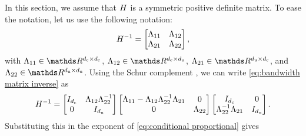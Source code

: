 In this section, we assume that $H$ is a symmetric positive definite matrix. 
To ease the notation, let us use the following notation:
\begin{equation}
	\label{eq:bandwidth matrix inverse}
	H^{-1} = 
	\begin{bmatrix}
		\Lambda_{11} & \Lambda_{12} \\ \Lambda_{21} & \Lambda_{22}
	\end{bmatrix},
\end{equation}
with $\bwiul \in \realnumbers^{\dimensionparta \times \dimensionparta}$, $\bwiur \in \realnumbers^{\dimensionparta \times \dimensionpartb}$, $\bwibl \in \realnumbers^{\dimensionpartb \times \dimensionparta}$, and $\bwibr \in \realnumbers^{\dimensionpartb \times \dimensionpartb}$.
Using the Schur complement \autocite{zhang2006schur}, we can write \cref{eq:bandwidth matrix inverse} as
\begin{equation}
	\label{eq:schur lemma}
	H^{-1}
	= \begin{bmatrix} I_{d_\mathrm{c}} & \Lambda_{12} \Lambda_{22}^{-1} \\ 0 & I_{d_\mathrm{u}} \end{bmatrix}
	\begin{bmatrix} \Lambda_{11} - \Lambda_{12} \Lambda_{22}^{-1} \Lambda_{21}  & 0 \\ 0 & \Lambda_{22} \end{bmatrix}
	\begin{bmatrix} I_{d_\mathrm{c}}  & 0 \\ \Lambda_{22}^{-1} \Lambda_{21} & I_{d_\mathrm{u}} \end{bmatrix}.
\end{equation}
Substituting this in the exponent of \cref{eq:conditional proportional} gives
